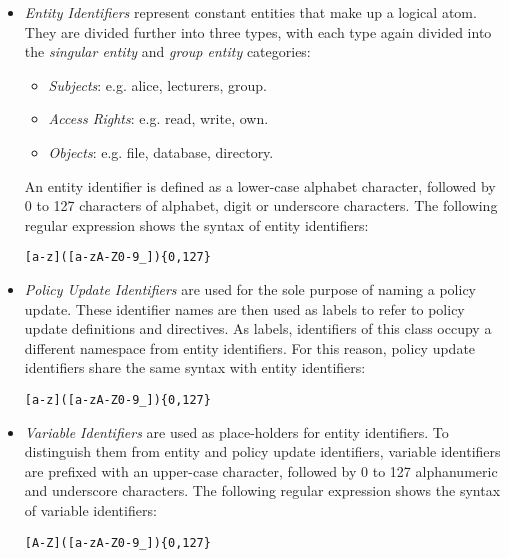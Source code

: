 \documentclass[global,twocolumn,final]{svjour}
\newenvironment{vverbatim}
  {\begin{alltt}}
  {\vspace{-\baselineskip}\end{alltt}}
\begin{document}
          \begin{itemize}
            \item
              {\em Entity Identifiers} represent constant entities that make up
              a logical atom. They are divided further into three types, with
              each type again divided into the {\em singular entity} and
              {\em group entity} categories:

              \begin{itemize}
                \item
                  {\em Subjects}: e.g. alice, lecturers, group.
                \item
                  {\em Access Rights}: e.g. read, write, own.
                \item
                  {\em Objects}: e.g. file, database, directory.
              \end{itemize}

              An entity identifier is defined as a lower-case alphabet
              character, followed by 0 to 127 characters of alphabet, digit or
              underscore characters. The following regular expression shows the
              syntax of entity identifiers:

              \begin{vverbatim}
  [a-z]([a-zA-Z0-9\_])\{0,127\}
              \end{vverbatim}

            \item
              {\em Policy Update Identifiers} are used for the sole purpose of
              naming a policy update. These identifier names are then used as
              labels to refer to policy update definitions and directives. As
              labels, identifiers of this class occupy a different namespace
              from entity identifiers. For this reason, policy update
              identifiers share the same syntax with entity identifiers:


              \begin{vverbatim}
  [a-z]([a-zA-Z0-9\_])\{0,127\}
              \end{vverbatim}

            \item
              {\em Variable Identifiers} are used as place-holders for entity
              identifiers. To distinguish them from entity and policy update
              identifiers, variable identifiers are prefixed with an upper-case
              character, followed by 0 to 127 alphanumeric and underscore
              characters. The following regular expression shows the syntax of
              variable identifiers:

              \begin{vverbatim}
  [A-Z]([a-zA-Z0-9\_])\{0,127\}
              \end{vverbatim}
          \end{itemize}
\end{document}
